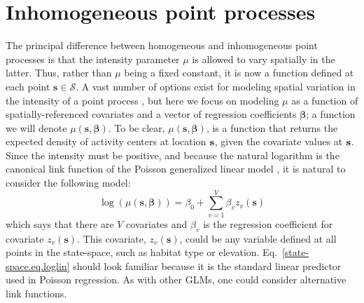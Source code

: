 \section{Inhomogeneous point processes}

The principal difference between homogeneous and inhomogeneous point
processes is that the intensity parameter $\mu$ is allowed to vary spatially
in the latter. Thus, rather than $\mu$ being a fixed constant,
it is now a function defined at each point $\mathbf{s} \in
\mathcal{S}$. A vast number of options exist for modeling spatial
variation in the intensity of a point process
\citep{cox:1955,stoyan_penttinen:2000,illian_etal:2008}, but here we
focus on modeling $\mu$ as a function of
spatially-referenced covariates and a vector of regression
coefficients $\bm \beta$; a function we will denote $\mu(\mathbf{s},
\bm{\beta})$. To be clear, $\mu(\mathbf{s}, \bm{\beta})$, is a
function that returns the expected density of activity centers at
location $\bf s$, given the covariate values at $\bf s$.  Since the
intensity must be positive, and because the natural logarithm is the
canonical link function of the Poisson generalized linear model
\citep{mccullagh_nelder:1989}, it is natural to consider the following model:
\begin{equation}
  \log(\mu(\mathbf{s}, {\bm \beta})) = \beta_0 + \sum_{v=1}^V \beta_v z_v(\mathbf{s})%
  \label{state-space.eq.loglin}
\end{equation}
which says that there are $V$ covariates and $\beta_v$ is the
regression coefficient for covariate $z_v(\mathbf{s})$. This
covariate, $z_v(\mathbf{s})$, could be any variable defined at all points
in the state-space, such as habitat type or elevation.
Eq.~\ref{state-space.eq.loglin} should look familiar because it is the
standard linear predictor used in Poisson regression. As with other
GLMs, one could consider alternative link functions.

